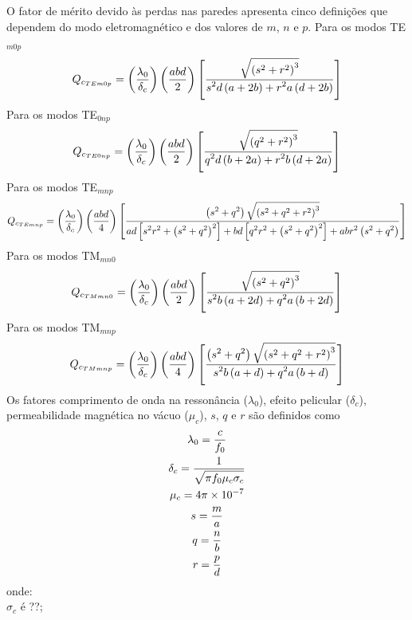 	
O fator de mérito devido às perdas nas paredes apresenta cinco definições que dependem do modo eletromagnético e dos valores de $m$, $n$ e $p$. Para os modos TE$_{m0p}$
\begin{equation*}	Q_{c_{TEm0p}}=\left(\displaystyle \frac{\displaystyle \lambda_0 }{ \displaystyle \delta_c}\right)\left(\displaystyle \frac{\displaystyle abd }{ \displaystyle 2}\right)\left[\displaystyle \frac{\displaystyle \sqrt{\left(s^2 + r^2\right)^3} }{ \displaystyle s^2d\left(a + 2b\right) + r^2a\left(d + 2b\right)}\right]
\end{equation*}
 Para os modos TE$_{0np}$
\begin{equation*}	Q_{c_{TE0np}}=\left(\displaystyle \frac{\displaystyle \lambda_0 }{ \displaystyle \delta_c}\right)\left(\displaystyle \frac{\displaystyle abd }{ \displaystyle 2}\right)\left[\displaystyle \frac{\displaystyle \sqrt{\left(q^2 + r^2\right)^3} }{ \displaystyle q^2d\left(b + 2a\right) + r^2b\left(d + 2a\right)}\right]
\end{equation*}
Para os modos TE$_{mnp}$
\begin{equation*}		Q_{c_{TEmnp}}=\left(\displaystyle \frac{\displaystyle \lambda_0 }{ \displaystyle \delta_c}\right)\left(\displaystyle \frac{\displaystyle abd }{ \displaystyle 4}\right)\left[\displaystyle \frac{\displaystyle \left(s^2 + q^2\right)\sqrt{\left(s^2 + q^2 + r^2\right)^3} }{ \displaystyle ad\left[s^2r^2 + \left(s^2 + q^2\right)^2\right] + bd\left[q^2r^2 + \left(s^2 + q^2\right)^2\right] + abr^2\left(s^2 + q^2\right)}\right]
\end{equation*}
Para os modos TM$_{mn0}$
\begin{equation*}
Q_{c_{TMmn0}}=\left(\displaystyle \frac{\displaystyle \lambda_0 }{ \displaystyle \delta_c}\right)\left(\displaystyle \frac{\displaystyle abd }{ \displaystyle 2}\right)\left[\displaystyle \frac{\displaystyle \sqrt{\left(s^2+q^2\right)^3} }{ \displaystyle s^2b\left(a+2d\right)+q^2a\left(b+2d\right)}\right]	
\end{equation*}
Para os modos TM$_{mnp}$
\begin{equation*}
Q_{c_{TMmnp}}=\left(\displaystyle \frac{\displaystyle \lambda_0 }{ \displaystyle \delta_c}\right)\left(\displaystyle \frac{\displaystyle abd }{ \displaystyle 4}\right)\left[\displaystyle \frac{\displaystyle \left(s^2+q^2\right)\sqrt{\left(s^2+q^2+r^2\right)^3} }{ \displaystyle s^2b\left(a+d\right)+q^2a\left(b+d\right)}\right]	
\end{equation*}
Os fatores comprimento de onda na ressonância ($\lambda_0$), efeito pelicular ($\delta_c$), permeabilidade magnética no vácuo ($\mu_c$), $s$, $q$ e $r$ são definidos como
\begin{gather*}
	\lambda_0=\displaystyle \frac{\displaystyle c }{ \displaystyle f_0}\\
	\delta_c=\displaystyle \frac{\displaystyle 1 }{ \displaystyle \sqrt{\pi f_0\mu_c\sigma_c}}\\
	\mu_c=4\pi\times 10^{-7}\\
	s=\displaystyle \frac{\displaystyle m }{ \displaystyle a}\\
		q=\displaystyle \frac{\displaystyle n }{ \displaystyle b}\\
			r=\displaystyle \frac{\displaystyle p }{ \displaystyle d}
\end{gather*}
onde:\\
$\sigma_c$ é ??;


